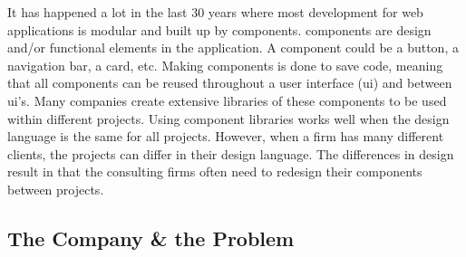 It has happened a lot in the last 30 years where most development for web applications is modular and built up by \glspl{component}. \Glspl{component} are design and/or functional elements in the application. A \gls{component} could be a button, a navigation bar, a card\cite{babichSimpleDesignTips2020}, etc. Making \glspl{component} is done to save code, meaning that all \glspl{component} can be reused throughout a user interface (\acrshort{ui}) and between \acrshort{ui}'s. Many companies create extensive libraries of these \glspl{component} to be used within different projects. Using \gls{component} libraries works well when the design language is the same for all projects. However, when a firm has many different clients, the projects can differ in their design language. The differences in design result in that the consulting firms often need to redesign their \glspl{component} between projects. 






\subsection{The Company \& the Problem}
\label{sub:company}




